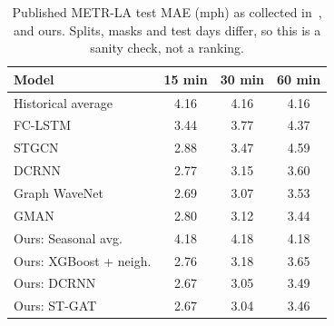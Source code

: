 \begin{table}[t]
\centering
\caption{Published METR-LA test MAE (mph) as collected in~\cite{wu2019graphwavenet,zheng2020gman}, and ours. Splits, masks and test days differ, so this is a sanity check, not a ranking.}
\label{tab:lit}
\setlength{\tabcolsep}{5pt}
\begin{tabular}{@{}lccc@{}}
\toprule
Model & 15 min & 30 min & 60 min \\
\midrule
Historical average & 4.16 & 4.16 & 4.16 \\
FC-LSTM~\cite{sutskever2014} & 3.44 & 3.77 & 4.37 \\
STGCN~\cite{yu2018stgcn} & 2.88 & 3.47 & 4.59 \\
DCRNN~\cite{li2018dcrnn} & 2.77 & 3.15 & 3.60 \\
Graph WaveNet~\cite{wu2019graphwavenet} & 2.69 & 3.07 & 3.53 \\
GMAN~\cite{zheng2020gman} & 2.80 & 3.12 & 3.44 \\
\midrule
Ours: Seasonal avg. & 4.18 & 4.18 & 4.18 \\
Ours: XGBoost + neigh. & 2.76 & 3.18 & 3.65 \\
Ours: DCRNN & 2.67 & 3.05 & 3.49 \\
Ours: ST-GAT & 2.67 & 3.04 & 3.46 \\
\bottomrule
\end{tabular}
\end{table}
